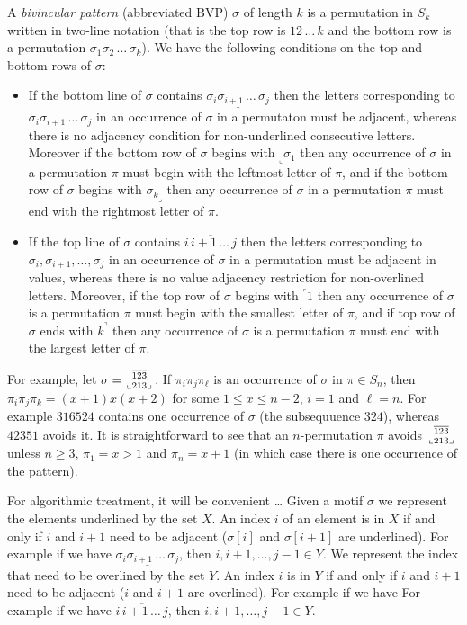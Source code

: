 \documentclass[a4paper]{llncs}
\newcommand{\pmotif}{\sigma}
\newcommand\BV[2]{\genfrac{}{}{0pt}{}{#1}{#2}}
\newcommand{\x}{X}
\newcommand{\y}{Y}
\begin{document}
A \emph{bivincular pattern} (abbreviated BVP) $\sigma$
of length $k$ is a permutation in $S_k$ written in
two-line notation
(that is the top row is $12\,\ldots\,k$ and the bottom row
is a permutation $\sigma_1\sigma_2\,\ldots\,\sigma_k$).
We have the following conditions on the top and bottom rows
of $\sigma$:
\begin{itemize}
	\item
	If the bottom line of $\sigma$ contains
	$\underline{\sigma_i\sigma_{i+1}\,\ldots\,\sigma_j}$
	then the letters corresponding to
	$\sigma_i\sigma_{i+1}\,\ldots\,\sigma_j$ in an occurrence of
	$\sigma$ in a permutaton must be adjacent, whereas there is
	no adjacency condition for
	non-underlined consecutive letters.
	Moreover if the bottom row of $\sigma$ begins with
	$_\llcorner{\sigma_1}$ then any occurrence of $\sigma$
	in a permutation $\pi$ must begin with the leftmost
	letter of $\pi$,
	and
	if the bottom row of $\sigma$ begins with
	${\sigma_k}_\lrcorner$ then any occurrence of $\sigma$
	in a permutation $\pi$ must end with the rightmost
	letter of $\pi$.
	\item
	If the top line of $\sigma$ contains
	$\overline{i\,i+1\,\ldots\,j}$ then the letters corresponding to
	$\sigma_i, \sigma_{i+1}, \ldots, \sigma_j$ in an
	occurrence of $\sigma$ in a permutation must be adjacent in values,
	whereas there is no value adjacency restriction for non-overlined
	letters.
	Moreover, if the top row of $\sigma$ begins with
	$^\ulcorner{1}$ then
	any occurrence of $\sigma$ is a permutation $\pi$ must begin with
	the smallest letter of $\pi$, and
	if top row of $\sigma$ ends with $k^\urcorner$ then
	any occurrence of $\sigma$ is a permutation $\pi$ must end with
	the largest letter of $\pi$.
\end{itemize}
For example,
let
$\sigma = \BV{\overline{123}}{\llcorner 213 \lrcorner}$.
If $\pi_i\pi_j\pi_\ell$ is an occurrence of $\sigma$ in $\pi \in S_n$,
then $\pi_i\pi_j\pi_k = (x+1)x(x+2)$ for some $1 \leq x \leq n-2$,
$i=1$ and $\ell = n$.
For example $316524$ contains one occurrence of $\sigma$ (the subsequuence $324$),
whereas $42351$ avoids it.
It is straightforward to see that an $n$-permutation
$\pi$ avoids $\BV{\overline{123}}{\llcorner 213 \lrcorner}$ unless
$n \geq 3$,
$\pi_1 = x > 1$
and $\pi_n = x+1$
(in which case there is one occurrence of the pattern).

For algorithmic treatment, it will be convenient \ldots
Given a motif $\pmotif$ we represent the elements underlined by the set $\x$. An index $i$ of an element is in $\x$ if and only if $i$ and $i+1$ need to be adjacent ($\pmotif[i]$ and $\pmotif[i+1]$ are underlined).
For example if we have $\underline{\sigma_i\sigma_{i+1}\,\ldots\,\sigma_j}$, then ${i,i+1,\ldots,j-1} \in \y$.
We represent the index that need to be overlined by the set $\y$. An index $i$ is in $\y$ if and only if $i$ and $i+1$ need to be adjacent ($i$ and $i+1$ are overlined).
For example if we have
For example if we have $\overline{i\,i+1\,\ldots\,j}$, then ${i,i+1,\ldots,j-1} \in \y$.
\end{document}
